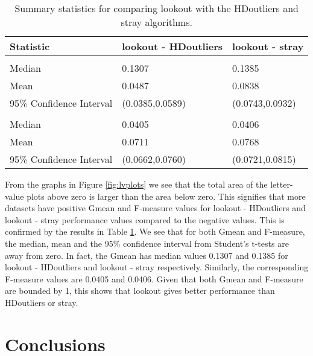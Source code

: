\documentclass[
]{article}
\begin{document}
\begin{table}

\caption{\label{tab:table}Summary statistics for comparing lookout with the HDoutliers and stray algorithms.}
\centering
\begin{tabular}[t]{lll}
\toprule
Statistic & lookout - HDoutliers & lookout - stray\\
\midrule
\addlinespace[0.3em]
\multicolumn{3}{l}{\textbf{Fmeasure}}\\
\hspace{1em}Median & 0.1307 & 0.1385\\
\hspace{1em}Mean & 0.0487 & 0.0838\\
\hspace{1em}95\% Confidence Interval & (0.0385,0.0589) & (0.0743,0.0932)\\
\addlinespace[0.3em]
\multicolumn{3}{l}{\textbf{Gmean}}\\
\hspace{1em}Median & 0.0405 & 0.0406\\
\hspace{1em}Mean & 0.0711 & 0.0768\\
\hspace{1em}95\% Confidence Interval & (0.0662,0.0760) & (0.0721,0.0815)\\
\bottomrule
\end{tabular}
\end{table}

From the graphs in Figure \ref{fig:lvplots} we see that the total area
of the letter-value plots above zero is larger than the area below zero.
This signifies that more datasets have positive Gmean and F-measure
values for lookout - HDoutliers and lookout - stray performance values
compared to the negative values. This is confirmed by the results in
Table \ref{tab:table}. We see that for both Gmean and F-measure, the
median, mean and the 95\% confidence interval from Student's t-tests are
away from zero. In fact, the Gmean has median values 0.1307 and 0.1385
for lookout - HDoutliers and lookout - stray respectively. Similarly,
the corresponding F-measure values are 0.0405 and 0.0406. Given that
both Gmean and F-measure are bounded by 1, this shows that lookout gives
better performance than HDoutliers or stray.

\hypertarget{sec:conclusions}{%
\section{Conclusions}\label{sec:conclusions}}
\end{document}
